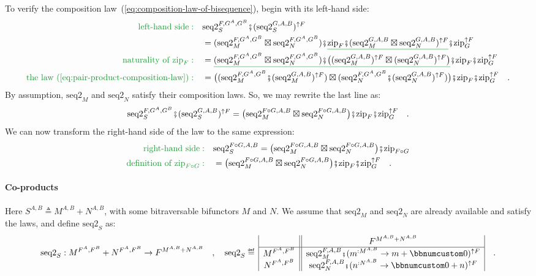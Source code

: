 To verify the composition law~(\ref{eq:composition-law-of-bisequence}),
begin with its left-hand side:
\begin{align*}
{\color{greenunder}\text{left-hand side}:}\quad & \text{seq2}_{S}^{F,G^{A},G^{B}}\bef(\text{seq2}_{S}^{G,A,B})^{\uparrow F}\\
 & =(\text{seq2}_{M}^{F,G^{A},G^{B}}\boxtimes\text{seq2}_{N}^{F,G^{A},G^{B}})\bef\gunderline{\text{zip}_{F}\bef(\text{seq2}_{M}^{G,A,B}\boxtimes\text{seq2}_{N}^{G,A,B})^{\uparrow F}}\bef\text{zip}_{G}^{\uparrow F}\\
{\color{greenunder}\text{naturality of }\text{zip}_{F}:}\quad & =\gunderline{(\text{seq2}_{M}^{F,G^{A},G^{B}}\boxtimes\text{seq2}_{N}^{F,G^{A},G^{B}})\bef\big((\text{seq2}_{M}^{G,A,B})^{\uparrow F}\boxtimes(\text{seq2}_{N}^{G,A,B})^{\uparrow F}\big)}\bef\text{zip}_{F}\bef\text{zip}_{G}^{\uparrow F}\\
{\color{greenunder}\text{the law~(\ref{eq:pair-product-composition-law})}:}\quad & =\big((\text{seq2}_{M}^{F,G^{A},G^{B}}\bef(\text{seq2}_{M}^{G,A,B})^{\uparrow F})\boxtimes(\text{seq2}_{N}^{F,G^{A},G^{B}}\bef(\text{seq2}_{N}^{G,A,B})^{\uparrow F})\big)\bef\text{zip}_{F}\bef\text{zip}_{G}^{\uparrow F}\quad.
\end{align*}
By assumption, $\text{seq2}_{M}$ and $\text{seq2}_{N}$ satisfy their
composition laws. So, we may rewrite the last line as:
\[
\text{seq2}_{S}^{F,G^{A},G^{B}}\bef(\text{seq2}_{S}^{G,A,B})^{\uparrow F}=\big(\text{seq2}_{M}^{F\circ G,A,B}\boxtimes\text{seq2}_{N}^{F\circ G,A,B}\big)\bef\text{zip}_{F}\bef\text{zip}_{G}^{\uparrow F}\quad.
\]
We can now transform the right-hand side of the law to the same expression:
\begin{align*}
{\color{greenunder}\text{right-hand side}:}\quad & \text{seq2}_{S}^{F\circ G,A,B}=\big(\text{seq2}_{M}^{F\circ G,A,B}\boxtimes\text{seq2}_{N}^{F\circ G,A,B}\big)\bef\text{zip}_{F\circ G}\\
{\color{greenunder}\text{definition of }\text{zip}_{F\circ G}:}\quad & =\big(\text{seq2}_{M}^{F\circ G,A,B}\boxtimes\text{seq2}_{N}^{F\circ G,A,B}\big)\bef\text{zip}_{F}\bef\text{zip}_{G}^{\uparrow F}\quad.
\end{align*}


\paragraph{Co-products}

Here $S^{A,B}\triangleq M^{A,B}+N^{A,B}$, with some bitraversable
bifunctors $M$ and $N$. We assume that $\text{seq2}_{M}$ and $\text{seq2}_{N}$
are already available and satisfy the laws, and define $\text{seq2}_{S}$
as:
\[
\text{seq2}_{S}:M^{F^{A},F^{B}}+N^{F^{A},F^{B}}\rightarrow F^{M^{A,B}+N^{A,B}}\quad,\quad\text{seq2}_{S}\triangleq\,\begin{array}{|c||c|}
 & F^{M^{A,B}+N^{A,B}}\\
\hline M^{F^{A},F^{B}} & \text{seq2}_{M}^{F,A,B}\bef(m^{:M^{A,B}}\rightarrow m+\bbnum 0)^{\uparrow F}\\
N^{F^{A},F^{B}} & \text{seq2}_{N}^{F,A,B}\bef(n^{:N^{A,B}}\rightarrow\bbnum 0+n)^{\uparrow F}
\end{array}\quad.
\]

